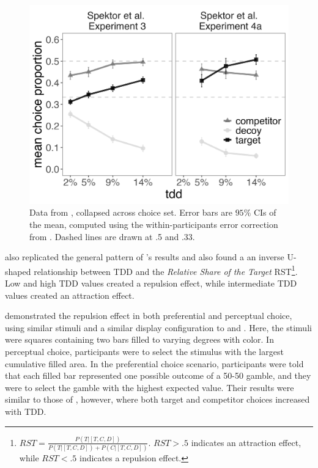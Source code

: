 \begin{figure}
   \includegraphics[width=\linewidth]{figures/spektor_data_collapsed.jpeg}
   \caption{Data from \textcite{spektorWhenGoodLooks2018b}, collapsed across choice set. Error bars are $95\%$ CIs of the mean, computed using the within-participants error correction from \textcite{morey2008confidence}. Dashed lines are drawn at .5 and .33.}
   \label{fig:spektor_data} %
\end{figure}

\textcite{liaoInfluenceDistanceDecoy2021} also replicated the general pattern of \textcite{spektorWhenGoodLooks2018b}'s results and also found a an inverse U-shaped relationship between TDD and the \textit{Relative Share of the Target} RST\footnote{$RST=\frac{P(T|[T,C,D])}{P(T|[T,C,D])+P(C|[T,C,D])}$. $RST>.5$ indicates an attraction effect, while $RST<.5$ indicates a repulsion effect.}. Low and high TDD values created a repulsion effect, while intermediate TDD values created an attraction effect. 

\textcite{spektorRepulsionEffectPreferential2022} demonstrated the repulsion effect in both preferential and perceptual choice, using similar stimuli and a similar display configuration to \textcite{spektorWhenGoodLooks2018b} and \textcite{liaoInfluenceDistanceDecoy2021}. Here, the stimuli were squares containing two bars filled to varying degrees with color. In perceptual choice, participants were to select the stimulus with the largest cumulative filled area. In the preferential choice scenario, participants were told that each filled bar represented one possible outcome of a 50-50 gamble, and they were to select the gamble with the highest expected value. Their results were similar to those of \textcite{spektorWhenGoodLooks2018b}, however, where both target and competitor choices increased with TDD.

